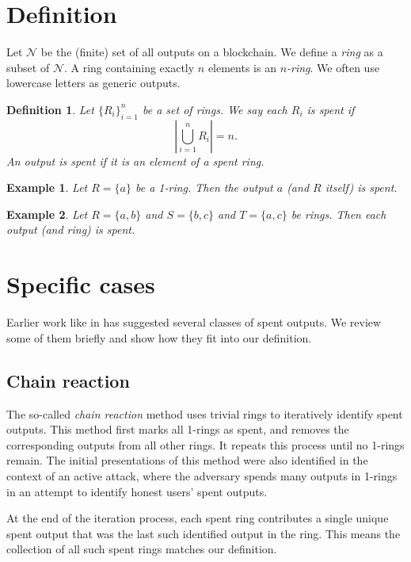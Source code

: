\documentclass{mrl}
\newtheorem{definition}{Definition}
\newtheorem{example}{Example}
\begin{document}
\section{Definition}
Let $\mathcal{N}$ be the (finite) set of all outputs on a blockchain. We define a \textit{ring} as a subset of $\mathcal{N}$. A ring containing exactly $n$ elements is an $n$\textit{-ring}. We often use lowercase letters as generic outputs.

\begin{definition}
Let $\{R_i\}_{i=1}^n$ be a set of rings. We say each $R_i$ is \textit{spent} if $$\left| \bigcup_{i=1}^n R_i \right| = n.$$ An output is \textit{spent} if it is an element of a spent ring.
\end{definition}

\begin{example}
Let $R = \{a\}$ be a 1-ring. Then the output $a$ (and $R$ itself) is spent.
\end{example}

\begin{example}
Let $R = \{a,b\}$ and $S = \{b,c\}$ and $T = \{a,c\}$ be rings. Then each output (and ring) is spent.
\end{example}

\section{Specific cases}
Earlier work like in \cite{mrl0001,mrl0004,kumar,moser,wijaya} has suggested several classes of spent outputs. We review some of them briefly and show how they fit into our definition.

\subsection{Chain reaction}
The so-called \textit{chain reaction} method uses trivial rings to iteratively identify spent outputs. This method first marks all 1-rings as spent, and removes the corresponding outputs from all other rings. It repeats this process until no 1-rings remain. The initial presentations of this method were also identified in the context of an active attack, where the adversary spends many outputs in 1-rings in an attempt to identify honest users' spent outputs.

At the end of the iteration process, each spent ring contributes a single unique spent output that was the last such identified output in the ring. This means the collection of all such spent rings matches our definition.
\end{document}
